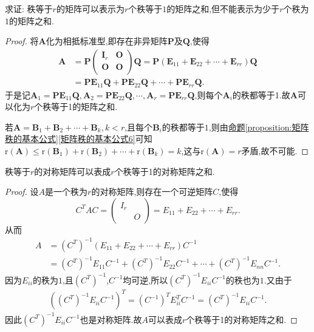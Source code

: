 \documentclass[lang=cn,newtx,10pt,scheme=chinese]{elegantbook}
\begin{document}
\begin{proposition}[矩阵的秩1分解]\label{proposition:矩阵的秩1分解}
求证: 秩等于\(r\)的矩阵可以表示为\(r\)个秩等于\(1\)的矩阵之和,但不能表示为少于\(r\)个秩为\(1\)的矩阵之和.
\end{proposition}
\begin{proof}
将\(\boldsymbol{A}\)化为相抵标准型,即存在非异矩阵\(\boldsymbol{P}\)及\(\boldsymbol{Q}\),使得
\begin{align*}
    \boldsymbol{A}&=\boldsymbol{P}\left( \begin{matrix}
        \boldsymbol{I}_r&		\boldsymbol{O}\\
        \boldsymbol{O}&		\boldsymbol{O}\\
    \end{matrix} \right) \boldsymbol{Q}=\boldsymbol{P}\left( \boldsymbol{E}_{11}+\boldsymbol{E}_{22}+\cdots +\boldsymbol{E}_{rr} \right) \boldsymbol{Q}
    \\
    &=\boldsymbol{PE}_{11}\boldsymbol{Q}+\boldsymbol{PE}_{22}\boldsymbol{Q}+\cdots +\boldsymbol{PE}_{rr}\boldsymbol{Q}.
\end{align*}
于是记$\boldsymbol{A}_1=\boldsymbol{PE}_{11}\boldsymbol{Q},\boldsymbol{A}_2=\boldsymbol{PE}_{22}\boldsymbol{Q},\cdots ,\boldsymbol{A}_r=\boldsymbol{PE}_{rr}\boldsymbol{Q}$,则每个$\boldsymbol{A}_i$的秩都等于1.故$\boldsymbol{A}$可以化为$r$个秩等于1的矩阵之和.

若\(\boldsymbol{A}=\boldsymbol{B}_1+\boldsymbol{B}_2+\cdots+\boldsymbol{B}_k,k < r\),且每个\(\boldsymbol{B}_i\)的秩都等于\(1\),则由\hyperref[矩阵秩的基本公式6]{命题\ref{proposition:矩阵秩的基本公式}\ref{矩阵秩的基本公式6}}可知\(\mathrm{r}(\boldsymbol{A})\leq\mathrm{r}(\boldsymbol{B}_1)+\mathrm{r}(\boldsymbol{B}_2)+\cdots+\mathrm{r}(\boldsymbol{B}_k)=k\),这与\(\mathrm{r}(\boldsymbol{A}) = r\)矛盾,故不可能.
\end{proof}

\begin{proposition}[对称矩阵的秩1分解]\label{proposition:对称矩阵的秩1分解}
    秩等于$r$的对称矩阵可以表成$r$个秩等于1的对称矩阵之和.
\end{proposition}
\begin{proof}
    设\(A\)是一个秩为\(r\)的对称矩阵,则存在一个可逆矩阵\(C\),使得
\[
C^TAC = \left( \begin{matrix}
I_r & \\
& O
\end{matrix} \right) = E_{11} + E_{22} + \cdots + E_{rr}.
\]
从而
\begin{align*}
    A &= (C^T)^{-1}(E_{11} + E_{22} + \cdots + E_{rr})C^{-1}
    \\
    &=(C^T)^{-1}E_{11}C^{-1} + (C^T)^{-1}E_{22}C^{-1} + \cdots + (C^T)^{-1}E_{nn}C^{-1}.
\end{align*}
因为\(E_{ii}\)的秩为\(1\),且\((C^T)^{-1}\),\(C^{-1}\)均可逆,所以\((C^T)^{-1}E_{ii}C^{-1}\)的秩也为\(1\).又由于
\begin{align*}
    ((C^T)^{-1}E_{ii}C^{-1})^T = (C^{-1})^TE_{ii}^TC^{-1} = (C^T)^{-1}E_{ii}C^{-1}.
\end{align*}
因此\((C^T)^{-1}E_{ii}C^{-1}\)也是对称矩阵.故$A$可以表成$r$个秩等于1的对称矩阵之和.
\end{proof}
\end{document}
